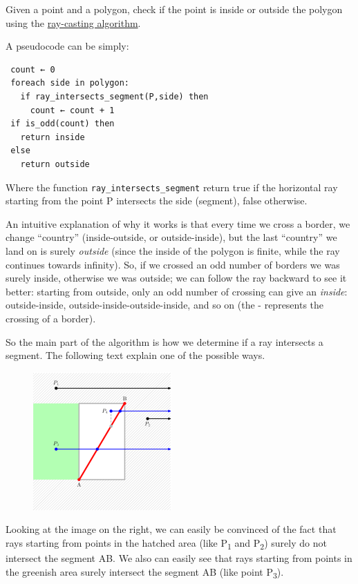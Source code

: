 Given a point and a polygon, check if the point is inside or outside the
polygon using the
\href{graphics/Point\_in\_polygon\#Ray\_casting\_algorithm}{ray-casting
algorithm}.

A pseudocode can be simply:

\begin{verbatim}
 count ← 0
 foreach side in polygon:
   if ray_intersects_segment(P,side) then
     count ← count + 1
 if is_odd(count) then
   return inside
 else
   return outside
\end{verbatim}

Where the function \texttt{ray\_intersects\_segment} return true if the
horizontal ray starting from the point P intersects the side (segment),
false otherwise.

An intuitive explanation of why it works is that every time we cross a
border, we change ``country'' (inside-outside, or outside-inside), but
the last ``country'' we land on is surely \emph{outside} (since the
inside of the polygon is finite, while the ray continues towards
infinity). So, if we crossed an odd number of borders we was surely
inside, otherwise we was outside; we can follow the ray backward to see
it better: starting from outside, only an odd number of crossing can
give an \emph{inside}: outside-inside, outside-inside-outside-inside,
and so on (the - represents the crossing of a border).

So the main part of the algorithm is how we determine if a ray
intersects a segment. The following text explain one of the possible
ways.

\begin{figure}[H]
  \centering
   \includegraphics[scale=.6]{graphics/200px-Intersect.png}
\end{figure}


Looking at the image on the right, we can easily be convinced of the
fact that rays starting from points in the hatched area (like
P\textsubscript{1} and P\textsubscript{2}) surely do not intersect the
segment AB. We also can easily see that rays starting from points in the
greenish area surely intersect the segment AB (like point
P\textsubscript{3}).

